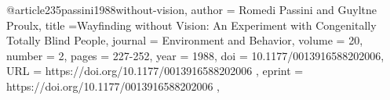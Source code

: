 @article{235passini1988without-vision,
author = {Romedi Passini and Guyltne Proulx},
title ={Wayfinding without Vision: An Experiment with Congenitally Totally Blind People},
journal = {Environment and Behavior},
volume = {20},
number = {2},
pages = {227-252},
year = {1988},
doi = {10.1177/0013916588202006},
URL = { https://doi.org/10.1177/0013916588202006 },
eprint = { https://doi.org/10.1177/0013916588202006 },
}